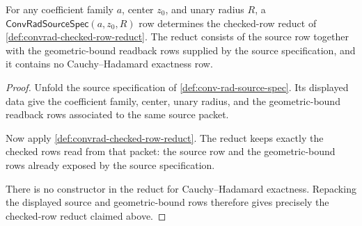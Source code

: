 \begin{theorem}
\label{thm:convergence-radius-checked-row-reduct-readback}
For any coefficient family $a$, center $z_0$, and unary radius $R$, a
$\mathsf{ConvRadSourceSpec}(a,z_0,R)$ row determines the checked-row reduct
of \autoref{def:convrad-checked-row-reduct}. The reduct consists of the source
row together with the geometric-bound readback rows supplied by the source
specification, and it contains no Cauchy--Hadamard exactness row.
\end{theorem}
\begin{proof}
Unfold the source specification of \autoref{def:conv-rad-source-spec}. Its
displayed data give the coefficient family, center, unary radius, and the
geometric-bound readback rows associated to the same source packet.

Now apply \autoref{def:convrad-checked-row-reduct}. The reduct keeps exactly
the checked rows read from that packet: the source row and the geometric-bound
rows already exposed by the source specification.

There is no constructor in the reduct for Cauchy--Hadamard exactness. Repacking
the displayed source and geometric-bound rows therefore gives precisely the
checked-row reduct claimed above.
\end{proof}

